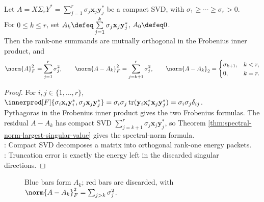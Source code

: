 \begin{proposition} \label{prop:rank-one-svd-orthogonality-and-truncation-error} \\
Let $A=X\Sigma_rY^*=\sum_{j=1}^{r}\sigma_j\mathbf{x}_j\mathbf{y}_j^*$ be a compact SVD, with $\sigma_1\geq\cdots\geq\sigma_r>0$.\\
For $0\leq k\leq r$, set $A_k\defeq\sum\limits_{j=1}^{k}\sigma_j\mathbf{x}_j\mathbf{y}_j^*$, $A_0\defeq0$.\\
Then the rank-one summands are mutually orthogonal in the Frobenius inner product, and
\begin{align}
\norm{A}_F^2=\sum_{j=1}^{r}\sigma_j^2,
\qquad
\norm{A-A_k}_F^2=\sum_{j=k+1}^{r}\sigma_j^2,
\qquad
\norm{A-A_k}_2=
\begin{cases}
\sigma_{k+1},&k<r,\\
0,&k=r.
\end{cases}
\nonumber
\end{align}
\begin{proof}
For $i,j\in\{1,\ldots,r\}$, $\innerprod[F]{\sigma_i\mathbf{x}_i\mathbf{y}_i^*,\sigma_j\mathbf{x}_j\mathbf{y}_j^*} =\sigma_i\sigma_j\operatorname{tr}(\mathbf{y}_i\mathbf{x}_i^*\mathbf{x}_j\mathbf{y}_j^*) =\sigma_i\sigma_j\delta_{ij}$.\\
Pythagoras in the Frobenius inner product gives the two Frobenius formulas. The residual $A-A_k$ has compact SVD $\sum_{j=k+1}^{r}\sigma_j\mathbf{x}_j\mathbf{y}_j^*$, so Theorem \ref{thm:spectral-norm-largest-singular-value} gives the spectral-norm formula.\\
: Compact SVD decomposes a matrix into orthogonal rank-one energy packets.\\
: Truncation error is exactly the energy left in the discarded singular directions.
\end{proof}
\end{proposition}

\begin{figure}[H]
  \centering
  
  \caption{Blue bars form $A_k$; red bars are discarded, with $\norm{A-A_k}_F^2=\sum_{j>k}\sigma_j^2$.}
  \label{fig:truncated-svd-energy}
\end{figure}

